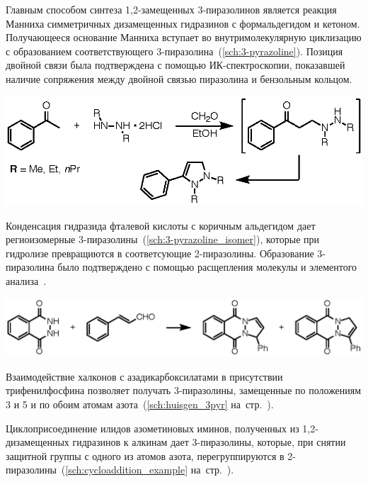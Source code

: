Главным способом синтеза 1,2-замещенных 3-пиразолинов является реакция Манниха симметричных дизамещенных гидразинов с формальдегидом и кетоном. Получающееся основание Манниха вступает во внутримолекулярную циклизацию с образованием соответствующего 3-пиразолина~(\ref{sch:3-pyrazoline}).
Позиция двойной связи была подтверждена с помощью ИК-спектроскопии, показавшей наличие сопряжения между двойной связью пиразолина и бензольным кольцом.

\begin{scheme}
    \centering
    \includegraphics{sections/literature/img/3-pyrazoline.eps}
    \caption{}
    \label{sch:3-pyrazoline}
\end{scheme}

Конденсация гидразида фталевой кислоты с коричным альдегидом дает региоизомерные 3-пиразолины~(\ref{sch:3-pyrazoline_isomer}), которые при гидролизе превращиются в соответсующие 2-пиразолины.
Образование 3-пиразолина было подтверждено с помощью расщепления молекулы и элементого анализа~\cite{Chemistry1967}.

\begin{scheme}
    \centering
    \includegraphics{sections/literature/img/3-pyrazoline_isomer.eps}
    \caption{}
    \label{sch:3-pyrazoline_isomer}
\end{scheme}
Взаимодействие халконов с азадикарбоксилатами в присутствии трифенилфосфина позволяет получать 3-пиразолины, замещенные по положениям 3 и 5 и по обоим атомам азота~(\ref{sch:huisgen_3pyr} на~стр.~\pageref{sch:huisgen_3pyr}).

Циклоприсоединение илидов азометиновых иминов, полученных из 1,2-дизамещенных гидразинов к алкинам дает 3-пиразолины, которые, при снятии защитной группы с одного из атомов азота, перегруппируются в 2-пиразолины~(\ref{sch:cycloaddition_example} на~стр.~\pageref{sch:cycloaddition_example}).

